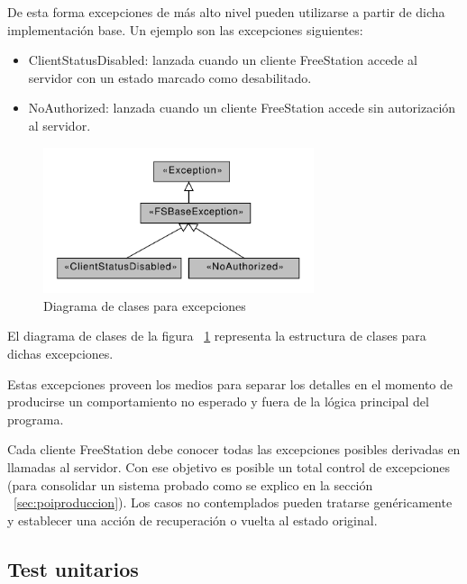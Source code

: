 De esta forma excepciones de más alto nivel pueden utilizarse a partir de dicha
implementación base. Un ejemplo son las excepciones siguientes:

\begin{itemize}
  \item ClientStatusDisabled: lanzada cuando un cliente FreeStation accede al
  servidor con un estado marcado como desabilitado.
  \item NoAuthorized: lanzada cuando un cliente FreeStation accede sin
  autorización al servidor.
\end{itemize} 

\begin{figure}[ht]
    \begin{center}
        \includegraphics[width=300px]{src/img/diagrams/freestation-class-diagram-exceptions.pdf}
        \caption[Diagrama de clases para excepciones]
          {Diagrama de clases para excepciones}
          \label{fig:classexceptions}
    \end{center}
\end{figure}

\newpage

El diagrama de clases de la figura ~\ref{fig:classexceptions} representa la
estructura de clases para dichas excepciones.

Estas excepciones proveen los medios para separar los detalles en el momento
de producirse un comportamiento no esperado y fuera de la lógica principal del
programa.

Cada cliente FreeStation debe conocer todas las excepciones posibles derivadas
en llamadas al servidor. Con ese objetivo es posible un total control de
excepciones (para consolidar un sistema probado como se explico en la sección
~\ref{sec:poiproduccion}). Los casos no contemplados pueden tratarse
genéricamente y establecer una acción de recuperación o 
vuelta al estado original.

\subsection{Test unitarios}

